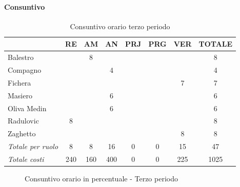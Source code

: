 \documentclass[a4paper,12pt]{article}
\begin{document}
            \paragraph{Consuntivo}
                \begin{table}[H]
                \centering
                \caption{Consuntivo orario terzo periodo}
                \begin{tabular}{|l|c|c|c|c|c|c|c|}
                \hline
                    \rowcolor{lightgray}{\textbf{Membro}} & {\textbf{RE}} & {\textbf{AM}} & {\textbf{AN}} & {\textbf{PRJ}} & {\textbf{PRG}} & {\textbf{VER}} & {\textbf{TOTALE}}\\
                \hline
                    Balestro & & 8 & & & & & 8\\
                \hline
                    Compagno & & & 4 & & & & 4\\
                \hline
                    Fichera & & & & & & 7 & 7\\
                \hline
                    Masiero & & & 6 & & & & 6\\
                \hline
                    Oliva Medin & & & 6 & & & & 6\\
                \hline
                    Radulovic & 8 & & & & & & 8\\
                \hline
                    Zaghetto & & & & & & 8 & 8\\
                \hline
                    \rowcolor{lightgray}\textit{Totale per ruolo} & 8 & 8 & 16 & 0 & 0 & 15 & 47\\
                \hline
                    \rowcolor{lightgray}\textit{Totale costi} & 240 & 160 & 400 & 0 & 0 & 225 & 1025\\
                \hline
                \end{tabular}
                \end{table}

                \begin{figure}[H]
                \centering
                \caption{Consuntivo orario in percentuale - Terzo periodo}
                \end{figure}
                
\end{document}
